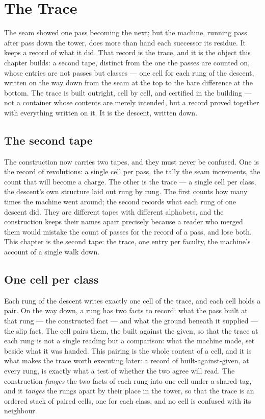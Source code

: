 \chapter{The Trace}
\label{chap:the-trace}

The seam showed one pass becoming the next; but the machine, running pass after pass down the tower, does
more than hand each successor its residue. It keeps a record of what it did. That record is the trace, and
it is the object this chapter builds: a second tape, distinct from the one the passes are counted on, whose
entries are not passes but classes --- one cell for each rung of the descent, written on the way down from
the seam at the top to the bare difference at the bottom. The trace is built outright, cell by cell, and
certified in the building --- not a container whose contents are merely intended, but a record proved
together with everything written on it. It is the descent, written down.

\section{The second tape}
\label{se:the-second-tape}

The construction now carries two tapes, and they must never be confused. One is the record of revolutions:
a single cell per pass, the tally the seam increments, the count that will become a charge. The other is
the trace --- a single cell per class, the descent's own structure laid out rung by rung. The first counts
how many times the machine went around; the second records what each rung of one descent did. They are
different tapes with different alphabets, and the construction keeps their names apart precisely because a
reader who merged them would mistake the count of passes for the record of a pass, and lose both. This
chapter is the second tape: the trace, one entry per faculty, the machine's account of a single walk down.

\section{One cell per class}
\label{se:one-cell-per-class}

Each rung of the descent writes exactly one cell of the trace, and each cell holds a pair. On the way down,
a rung has two facts to record: what the pass built at that rung --- the constructed fact --- and what the
ground beneath it supplied --- the slip fact. The cell pairs them, the built against the given, so that the
trace at each rung is not a single reading but a comparison: what the machine made, set beside what it was
handed. This pairing is the whole content of a cell, and it is what makes the trace worth executing later:
a record of built-against-given, at every rung, is exactly what a test of whether the two agree will read.
The construction \emph{funges} the two facts of each rung into one cell under a shared tag, and it
\emph{tanges} the rungs apart by their place in the tower, so that the trace is an ordered stack of paired
cells, one for each class, and no cell is confused with its neighbour.

